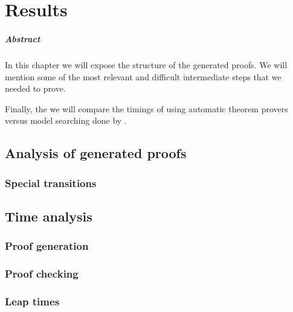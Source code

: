 \chapter{Results\label{chap:results}}

\paragraph{Abstract} In this chapter we will expose the structure of the generated proofs. We will mention some of the most relevant and difficult intermediate steps that we needed to prove.

Finally, the we will compare the timings of using automatic theorem provers versus model searching done by .

\section{Analysis of generated proofs}

\subsection{Special transitions}

\section{Time analysis}

\subsection{Proof generation}

\subsection{Proof checking}


\subsection{Leap times}


